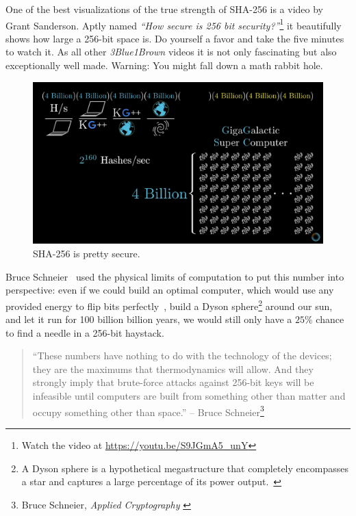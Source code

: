 One of the best visualizations of the true strength of SHA-256 is a video by
Grant Sanderson. Aptly named \textit{\enquote{How secure is 256 bit
security?}}\footnote{Watch the video at \url{https://youtu.be/S9JGmA5_unY}} it
beautifully shows how large a 256-bit space is. Do yourself a favor and take the
five minutes to watch it. As all other \textit{3Blue1Brown} videos it is not
only fascinating but also exceptionally well made. Warning: You might fall down
a math rabbit hole.

\begin{figure}
  \includegraphics{assets/images/youtube-vid.png}
  \caption{SHA-256 is pretty secure.}
  \label{fig:youtube-vid}
\end{figure}

Bruce Schneier~\cite{web:schneier} used the physical limits of computation to put this
number into perspective: even if we could build an optimal computer,
which would use any provided energy to flip bits perfectly~\cite{wiki:landauer}, build a
Dyson sphere\footnote{A Dyson sphere is a hypothetical megastructure that completely encompasses a star and captures a large percentage of its power output.~\cite{wiki:dyson}} around our sun, and let it run for 100 billion billion
years, we would still only have a $25\%$ chance to find a needle in a
256-bit haystack.

\begin{quotation}
``These numbers have nothing to do with the technology of the devices;
they are the maximums that thermodynamics will allow. And they
strongly imply that brute-force attacks against 256-bit keys will be
infeasible until computers are built from something other than matter
and occupy something other than space.''
\flushright -- Bruce Schneier\footnote{Bruce Schneier, \textit{Applied Cryptography} \cite{bruce-schneier}}
\end{quotation}


